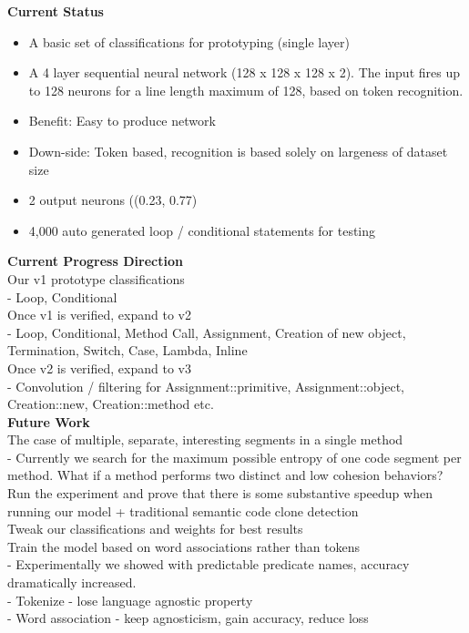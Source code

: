 \documentclass{article}
\begin{document}
    \textbf{Current Status}
    \begin{itemize}
        \item A basic set of classifications for prototyping (single layer)
        \item A 4 layer sequential neural network (128 x 128 x 128 x 2). The input fires up to 128 neurons for a line length maximum of 128, based on token recognition.
        \item Benefit: Easy to produce network
        \item Down-side: Token based, recognition is based solely on largeness of dataset size
        \item 2 output neurons ((0.23, 0.77) %
        \item 4,000 auto generated loop / conditional statements for testing
    \end{itemize}

    \textbf{Current Progress Direction} \\
    Our v1 prototype classifications\\
    - Loop, Conditional\\
    Once v1 is verified, expand to v2\\
    - Loop, Conditional, Method Call, Assignment, Creation of new object, Termination, Switch, Case, Lambda, Inline\\
    Once v2 is verified, expand to v3\\
    - Convolution / filtering for Assignment::primitive, Assignment::object, Creation::new, Creation::method etc.\\

    \textbf{Future Work}\\
    The case of multiple, separate, interesting segments in a single method\\
    - Currently we search for the maximum possible entropy of one code segment per method. What if a method performs two distinct and low cohesion behaviors?\\
    Run the experiment and prove that there is some substantive speedup when running our model + traditional semantic code clone detection\\
    Tweak our classifications and weights for best results\\
    Train the model based on word associations rather than tokens\\
    - Experimentally we showed with predictable predicate names, accuracy dramatically increased.\\
    - Tokenize - lose language agnostic property\\
    - Word association - keep agnosticism, gain accuracy, reduce loss\\
\end{document}
